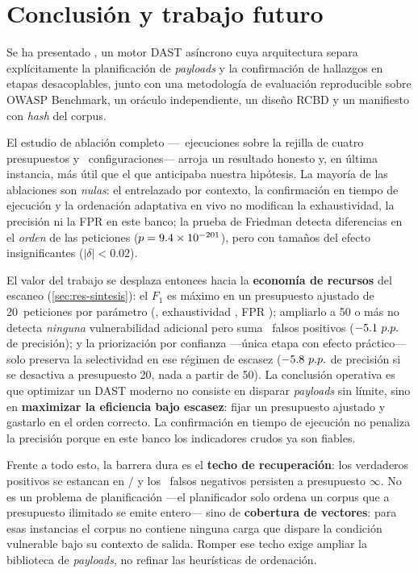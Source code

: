 
\section{Conclusión y trabajo futuro}
\label{sec:conclusion}

Se ha presentado \herramienta, un motor DAST asíncrono cuya arquitectura separa
explícitamente la planificación de \emph{payloads} y la confirmación de
hallazgos en etapas desacoplables, junto con una metodología de evaluación
reproducible sobre OWASP Benchmark, un oráculo independiente, un diseño RCBD y
un manifiesto con \emph{hash} del corpus.

El estudio de ablación completo —\NumCorridas{}~ejecuciones sobre la rejilla de
cuatro presupuestos y \NumCondiciones{}~configuraciones— arroja un resultado
honesto y, en última instancia, más útil que el que anticipaba nuestra
hipótesis. La mayoría de las ablaciones son \emph{nulas}: el entrelazado por
contexto, la confirmación en tiempo de ejecución y la ordenación adaptativa en
vivo no modifican la exhaustividad, la precisión ni la FPR en este banco; la
prueba de Friedman detecta diferencias en el \emph{orden} de las peticiones
($p = \num{9.4e-201}{}$), pero con tamaños del efecto insignificantes
($\lvert\delta\rvert < \num{0.02}$).

El valor del trabajo se desplaza entonces hacia la \textbf{economía de
recursos} del escaneo (\cref{sec:res-sintesis}): el $F_1$ es máximo en un
presupuesto ajustado de \num{20}~peticiones por parámetro (\ValorFOneBVeinte{},
exhaustividad \ValorRecallTecho{}, FPR \ValorFPRBaseline{}); ampliarlo a
\num{50} o más no detecta \emph{ninguna} vulnerabilidad adicional pero suma
\SaturacionFPnuevos{}~falsos positivos ($-\num{5.1}~p.p.{}$ de
precisión); y la priorización por confianza —única etapa con efecto práctico—
solo preserva la selectividad en ese régimen de escasez
($-\num{5.8}~p.p.{}$ de precisión si se desactiva a presupuesto
\num{20}, nada a partir de \num{50}). La conclusión operativa es que optimizar
un DAST moderno no consiste en disparar \emph{payloads} sin límite, sino en
\textbf{maximizar la eficiencia bajo escasez}: fijar un presupuesto ajustado y
gastarlo en el orden correcto. La confirmación en tiempo de ejecución no
penaliza la precisión porque en este banco los indicadores crudos ya son
fiables.

Frente a todo esto, la barrera dura es el \textbf{techo de recuperación}: los
verdaderos positivos se estancan en \ValorTPtecho{}$/$\NumVulnerables{} y los
\ValorFNtecho{}~falsos negativos persisten a presupuesto $\infty$. No es un
problema de planificación —el planificador solo ordena un corpus que a
presupuesto ilimitado se emite entero— sino de \textbf{cobertura de vectores}:
para esas instancias el corpus no contiene ninguna carga que dispare la
condición vulnerable bajo su contexto de salida. Romper ese techo exige
ampliar la biblioteca de \emph{payloads}, no refinar las heurísticas de
ordenación.

